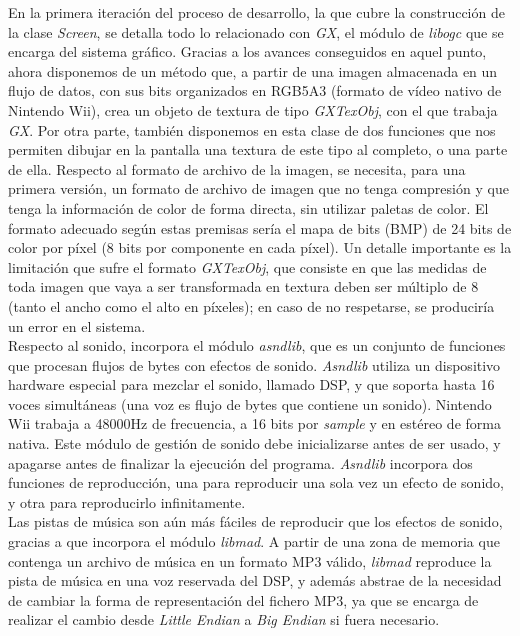 En la primera iteración del proceso de desarrollo, la que cubre la construcción de la clase \emph{Screen}, se detalla todo lo relacionado con \emph{GX}, el módulo de \emph{libogc} que se encarga del sistema gráfico. Gracias a los avances conseguidos en aquel punto, ahora disponemos de un método que, a partir de una imagen almacenada en un flujo de datos, con sus bits organizados en RGB5A3 (formato de vídeo nativo de Nintendo Wii), crea un objeto de textura de tipo \emph{GXTexObj}, con el que trabaja \emph{GX}. Por otra parte, también disponemos en esta clase de dos funciones que nos permiten dibujar en la pantalla una textura de este tipo al completo, o una parte de ella. Respecto al formato de archivo de la imagen, se necesita, para una primera versión, un formato de archivo de imagen que no tenga compresión y que tenga la información de color de forma directa, sin utilizar paletas de color. El formato adecuado según estas premisas sería el mapa de bits (BMP) de 24 bits de color por píxel (8 bits por componente en cada píxel). Un detalle importante es la limitación que sufre el formato \emph{GXTexObj}, que consiste en que las medidas de toda imagen que vaya a ser transformada en textura deben ser múltiplo de 8 (tanto el ancho como el alto en píxeles); en caso de no respetarse, se produciría un error en el sistema.\\

Respecto al sonido,  incorpora el módulo \emph{asndlib}, que es un conjunto de funciones que procesan flujos de bytes con efectos de sonido. \emph{Asndlib} utiliza un dispositivo hardware especial para mezclar el sonido, llamado DSP, y que soporta hasta 16 voces simultáneas (una voz es flujo de bytes que contiene un sonido). Nintendo Wii trabaja a 48000Hz de frecuencia, a 16 bits por \emph{sample} y en estéreo de forma nativa. Este módulo de gestión de sonido debe inicializarse antes de ser usado, y apagarse antes de finalizar la ejecución del programa. \emph{Asndlib} incorpora dos funciones de reproducción, una para reproducir una sola vez un efecto de sonido, y otra para reproducirlo infinitamente.\\

Las pistas de música son aún más fáciles de reproducir que los efectos de sonido, gracias a que  incorpora el módulo \emph{libmad}. A partir de una zona de memoria que contenga un archivo de música en un formato MP3 válido, \emph{libmad} reproduce la pista de música en una voz reservada del DSP, y además abstrae de la necesidad de cambiar la forma de representación del fichero MP3, ya que se encarga de realizar el cambio desde \emph{Little Endian} a \emph{Big Endian} si fuera necesario.\\

